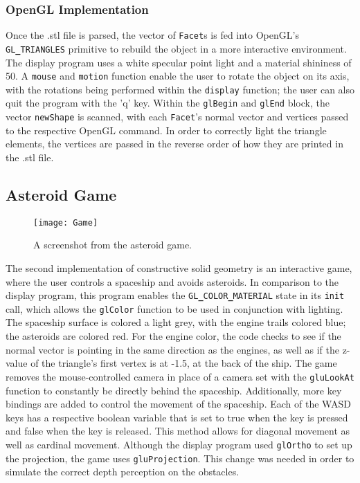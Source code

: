 \documentclass[12pt]{article}
\begin{document}
\begin{doublespace}
\subsubsection{OpenGL Implementation}
Once the .stl file is parsed, the vector of \texttt{Facet}s is fed into OpenGL's \texttt{GL{\bf\_}TRIANGLES} primitive to rebuild the object in a more interactive environment. The display program uses a white specular point light and a material shininess of 50. A \texttt{mouse} and \texttt{motion} function enable the user to rotate the object on its axis, with the rotations being performed within the \texttt{display} function; the user can also quit the program with the 'q' key. Within the \texttt{glBegin} and \texttt{glEnd} block, the vector \texttt{newShape} is scanned, with each \texttt{Facet}'s normal vector and vertices passed to the respective OpenGL command. In order to correctly light the triangle elements, the vertices are passed in the reverse order of how they are printed in the .stl file.
\subsection{Asteroid Game}
\begin{figure}
  \texttt{[image: Game]}
  \centering
  \caption{A screenshot from the asteroid game.}
\end{figure}
The second implementation of constructive solid geometry is an interactive game, where the user controls a spaceship and avoids asteroids. In comparison to the display program, this program enables the \texttt{GL{\bf\_}COLOR{\bf\_}MATERIAL} state in its \texttt{init} call, which allows the \texttt{glColor} function to be used in conjunction with lighting. The spaceship surface is colored a light grey, with the engine trails colored blue; the asteroids are colored red. For the engine color, the code checks to see if the normal vector is pointing in the same direction as the engines, as well as if the z-value of the triangle's first vertex is at -1.5, at the back of the ship. The game removes the mouse-controlled camera in place of a camera set with the \texttt{gluLookAt} function to constantly be directly behind the spaceship. Additionally, more key bindings are added to control the movement of the spaceship. Each of the WASD keys has a respective boolean variable that is set to true when the key is pressed and false when the key is released. This method allows for diagonal movement as well as cardinal movement. Although the display program used \texttt{glOrtho} to set up the projection, the game uses \texttt{gluProjection}. This change was needed in order to simulate the correct depth perception on the obstacles.\\


\end{doublespace}
\end{document}
